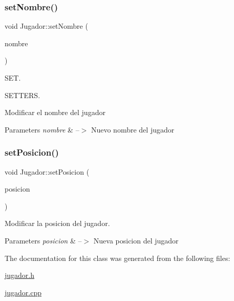 \subsubsection{\texorpdfstring{set\+Nombre()}{setNombre()}}
{\footnotesize\ttfamily void Jugador\+::set\+Nombre (\begin{DoxyParamCaption}\item[{Q\+String}]{nombre }\end{DoxyParamCaption})}



S\+ET. 

S\+E\+T\+T\+E\+RS.

Modificar el nombre del jugador 
\begin{DoxyParams}{Parameters}
{\em nombre} & --$>$ Nuevo nombre del jugador \\
\hline
\end{DoxyParams}
\mbox{\label{classJugador_a0b56f6473a446c7dd2c649dfc2d7cdea}} 
\subsubsection{\texorpdfstring{set\+Posicion()}{setPosicion()}}
{\footnotesize\ttfamily void Jugador\+::set\+Posicion (\begin{DoxyParamCaption}\item[{int}]{posicion }\end{DoxyParamCaption})}



Modificar la posicion del jugador. 


\begin{DoxyParams}{Parameters}
{\em posicion} & --$>$ Nueva posicion del jugador \\
\hline
\end{DoxyParams}


The documentation for this class was generated from the following files\+:\begin{DoxyCompactItemize}
\item 
\mbox{\hyperlink{jugador_8h}{jugador.\+h}}\item 
\mbox{\hyperlink{jugador_8cpp}{jugador.\+cpp}}\end{DoxyCompactItemize}
